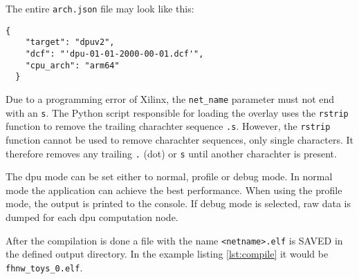 The entire \texttt{arch.json} file may look like this:
\begin{lstlisting}[style=bash, caption={}, label=lst:arch_json]
  {
  	"target": "dpuv2",
  	"dcf": "'dpu-01-01-2000-00-01.dcf'",
  	"cpu_arch": "arm64"
  }
\end{lstlisting}

Due to a programming error of Xilinx, the \texttt{net\_name} parameter must not end with an \texttt{s}.
The Python script responsible for loading the overlay uses the \texttt{rstrip} function to remove the trailing charachter sequence \texttt{.s}.
However, the \texttt{rstrip} function cannot be used to remove charachter sequences, only single characters.
It therefore removes any trailing \texttt{.} (dot) or \texttt{s} until another charachter is present.

The \acrshort{dpu} mode can be set either to normal, profile or debug mode.
In normal mode the application can achieve the best performance.
When using the profile mode, the output is printed to the console.
If debug mode is selected, raw data is dumped for each \acrshort{dpu} computation node.

After the compilation is done a file with the name \texttt{<netname>.elf} is SAVED in the defined output directory.
In the example listing \ref{lst:compile} it would be \texttt{fhnw\_toys\_0.elf}.
